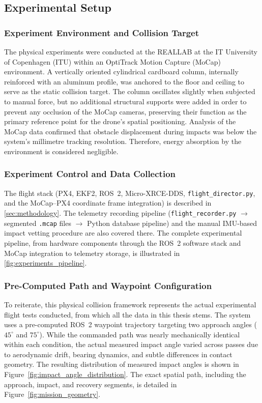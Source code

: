 \subsection{Experimental Setup}
\subsubsection{Experiment Environment and Collision Target}
The physical experiments were conducted at the REALLAB at the IT University of Copenhagen (ITU) within an OptiTrack Motion Capture (MoCap) environment. A vertically oriented cylindrical cardboard column, internally reinforced with an aluminum profile, was anchored to the floor and ceiling to serve as the static collision target. The column oscillates slightly when subjected to manual force, but no additional structural supports were added in order to prevent any occlusion of the MoCap cameras, preserving their function as the primary reference point for the drone's spatial positioning. Analysis of the MoCap data confirmed that obstacle displacement during impacts was below the system's millimetre tracking resolution. Therefore, energy absorption by the environment is considered negligible.

\subsubsection{Experiment Control and Data Collection}

The flight stack (PX4, EKF2, ROS~2, Micro-XRCE-DDS, \texttt{flight\_director.py}, and the MoCap--PX4 coordinate frame integration) is described in \autoref{sec:methodology}. The telemetry recording pipeline (\texttt{flight\_recorder.py} $\to$ segmented \texttt{.mcap} files $\to$ Python database pipeline) and the manual IMU-based impact vetting procedure are also covered there. The complete experimental pipeline, from hardware components through the ROS~2 software stack and MoCap integration to telemetry storage, is illustrated in \autoref{fig:experiments_pipeline}.

\subsubsection{Pre-Computed Path and Waypoint Configuration}

To reiterate, this physical collision framework represents the actual experimental flight tests conducted, from which all the data in this thesis stems. The system uses a pre-computed ROS~2 waypoint trajectory targeting two approach angles ($45^\circ$ and $75^\circ$). While the commanded path was nearly mechanically identical within each condition, the actual measured impact angle varied across passes due to aerodynamic drift, bearing dynamics, and subtle differences in contact geometry. The resulting distribution of measured impact angles is shown in Figure~\ref{fig:impact_angle_distribution}. The exact spatial path, including the approach, impact, and recovery segments, is detailed in Figure~\ref{fig:mission_geometry}.

